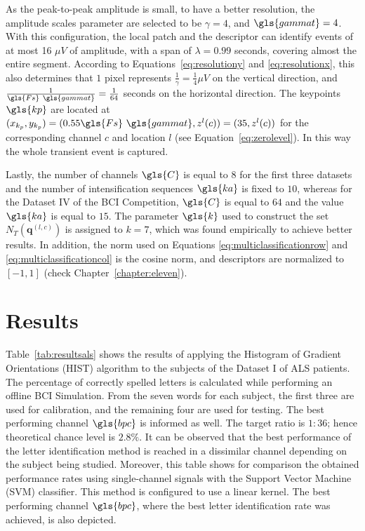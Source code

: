 As the peak-to-peak amplitude is small, to have a better resolution, the amplitude scales parameter are selected to be  $ \gamma = 4 $, and $\gls{gammat} = 4$.  With this configuration, the local patch and the descriptor can identify events of at most 16 $ \mu V $ of amplitude, with a span of $ \lambda = 0.99$ seconds, covering almost the entire segment.  According to Equations~\ref{eq:resolutiony} and \ref{eq:resolutionx}, this also determines that $ 1 $ pixel represents $ \frac{1}{\gamma}= \frac{1}{4} \mu V $ on the vertical direction, and $\frac{1}{\gls{Fs} \ \gls{gammat} }=\frac{1}{64}$ seconds on the horizontal direction. The keypoints  $\gls{kp}$  are located at $ (x_{k_p}, y_{k_p} )= ( 0.55 \gls{Fs} \ \gls{gammat}, z^l(c) )= (35,  z^l(c)) $ for the corresponding channel $c$ and location $l$ (see Equation~\ref{eq:zerolevel}).   In this way the whole transient event is captured. 

Lastly, the number of channels $\gls{C}$ is equal to $8$ for the first three datasets and the number of intensification sequences $\gls{ka}$ is fixed to $10$, whereas for the Dataset IV of the BCI Competition, $\gls{C}$ is equal to $64$ and the value $\gls{ka}$ is equal to $15$.   The parameter $\gls{k}$ used to construct the set $N_T(\mathbf{q}^{(l,c)})$ is assigned to $k=7$, which was found empirically to achieve better results.  In addition, the norm used on  Equations \ref{eq:multiclassificationrow} and \ref{eq:multiclassificationcol} is the cosine norm, and descriptors are normalized to $ \left[ -1, 1 \right] $ (check Chapter~\ref{chapter:eleven}).

\section{Results}

Table~\ref{tab:resultsals} shows the results of applying the Histogram of Gradient Orientations (HIST) algorithm to the subjects of the Dataset I of ALS patients. The percentage of correctly spelled letters is calculated while performing an offline BCI Simulation.  From the seven words for each subject, the first three are used for calibration, and the remaining four are used for testing.  The best performing channel  $\gls{bpc}$ is informed as well. The target ratio is $1:36$; hence theoretical chance level is $2.8\%$. It can be observed that the best performance of the letter identification method is reached in a dissimilar channel depending on the subject being studied.  Moreover, this table shows for comparison the obtained performance rates using single-channel signals with the Support Vector Machine (SVM) classifier.  This method is configured to use a linear kernel.  The best performing channel $\gls{bpc}$, where the best letter identification rate was achieved, is also depicted.


